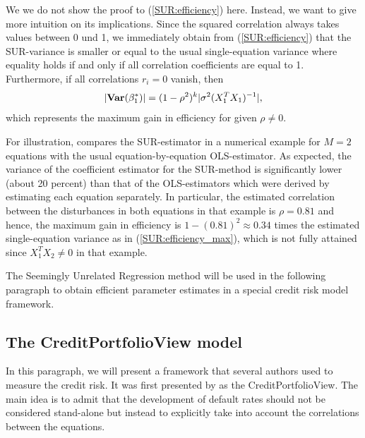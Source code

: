 \documentclass[a4paper, 11pt]{scrreprt}
\newcommand{\var}{\mbox{\textbf{Var}}}
\begin{document}
We we do not show the proof to (\ref{SUR:efficiency}) here. Instead, we want to give more intuition on its implications.
Since the squared correlation always takes values between 0 und 1, we immediately obtain from (\ref{SUR:efficiency}) that the SUR-variance is smaller or equal to the usual single-equation variance where equality holds if and only if all correlation coefficients are equal to 1. Furthermore, if all correlations $r_i = 0$ vanish, then 
\begin{equation}\label{SUR:efficiency_max}
| \var(\beta_1^*) | = (1-\rho^2)^k |\sigma^2 (X_1^T X_1)^{-1}|,
\end{equation}
which represents the maximum gain in efficiency for given $\rho \neq 0$.

For illustration, \textcite[table 1]{zellner1962efficient} compares the SUR-estimator in a numerical example for $M=2$ equations with the usual equation-by-equation OLS-estimator. As expected, the variance of the coefficient estimator for the SUR-method is significantly lower (about 20 percent) than that of the OLS-estimators which were derived by estimating each equation separately. In particular, the estimated correlation between the disturbances in both equations in that example is $\rho = 0.81$ and hence, the maximum gain in efficiency is $1-(0.81)^2 \approx 0.34$ times the estimated single-equation variance as in (\ref{SUR:efficiency_max}), which is not fully attained since $X_1^T X_2 \neq 0$ in that example.

The Seemingly Unrelated Regression method will be used in the following paragraph to obtain efficient parameter estimates in a special credit risk model framework.

\subsection{The CreditPortfolioView\texttrademark{} model}\label{par:wilson}

In this paragraph, we will present a framework that several authors used to measure the credit risk. It was first presented by \textcite{wilson1997wilsonI} as the CreditPortfolioView\texttrademark. The main idea is to admit that the development of default rates should not be \linebreak considered stand-alone but instead to explicitly take into account the correlations between the equations.
\end{document}
